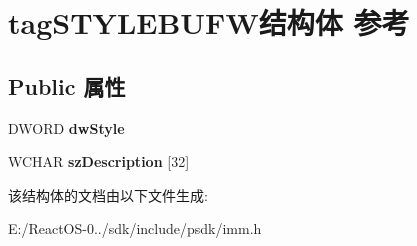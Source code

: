 \hypertarget{structtag_s_t_y_l_e_b_u_f_w}{}\section{tag\+S\+T\+Y\+L\+E\+B\+U\+F\+W结构体 参考}
\label{structtag_s_t_y_l_e_b_u_f_w}
\subsection*{Public 属性}
\begin{DoxyCompactItemize}
\item 
\mbox{\label{structtag_s_t_y_l_e_b_u_f_w_a8efa59db5ac7f64686e9c745cfb1b5e5}} 
D\+W\+O\+RD {\bfseries dw\+Style}
\item 
\mbox{\label{structtag_s_t_y_l_e_b_u_f_w_a943d064854fee20ab5298342205a3a1b}} 
W\+C\+H\+AR {\bfseries sz\+Description} \mbox{[}32\mbox{]}
\end{DoxyCompactItemize}


该结构体的文档由以下文件生成\+:\begin{DoxyCompactItemize}
\item 
E\+:/\+React\+O\+S-\/0../sdk/include/psdk/imm.\+h\end{DoxyCompactItemize}
